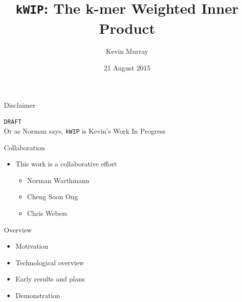 \documentclass[t]{beamer}
\title{\texttt{kWIP}: The k-mer Weighted Inner Product}
\author{Kevin Murray}
\institute{PhD Candidate, Borevitz Lab, CPEB, ANU}
\date{21 August 2015}
\begin{document}
{
\begin{frame}
  \titlepage
  \vfill
\end{frame}
}

\begin{frame}{Disclaimer}
  \begin{center}
    \vfill
    \large{\texttt{DRAFT}}
    \\
    \pause
    \vfill
    \small{Or as Norman says, \texttt{kWIP} is Kevin's Work In Progress}
    \vfill
  \end{center}
\end{frame}


\begin{frame}{Collaboration}
  \begin{itemize}
    \item This work is a collaborative effort
      \begin{itemize}
        \item Norman Warthmann
        \item Cheng Soon Ong
        \item Chris Webers
      \end{itemize}
  \end{itemize}
\end{frame}

\begin{frame}{Overview}
  \begin{itemize}
    \item Motivation
    \item Technological overview
    \item Early results and plans
    \item Demonstration
  \end{itemize}
\end{frame}
\end{document}
